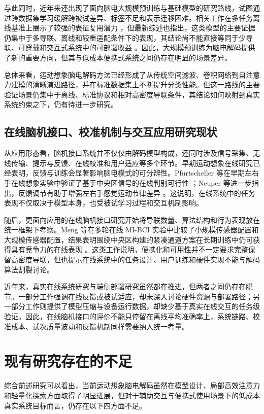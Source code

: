 与此同时，近年来还出现了面向脑电大规模预训练与基础模型的研究路线，试图通过跨数据集学习缓解跨被试差异、标签不足和表示迁移困难。相关工作在多任务离线基准上展示了较强的表征复用潜力 \cite{Jia24, Wan24b}，但最新综述也指出，这类模型的主要证据仍集中于多导联、离线和较重适配条件下的表现，其结论尚不能直接等同于少导联、可穿戴和交互式系统中的可部署收益 \cite{Liu26b}。因此，大规模预训练为脑电解码提供了新的重要方向，但其与低成本便携式系统之间仍存在明显的场景差异。

总体来看，运动想象脑电解码方法已经形成了从传统空间滤波、卷积网络到自注意力建模的清晰演进路径，并在标准数据集上不断提升分类性能。但这一路线的主要验证场景仍集中于离线、标准协议和相对高密度导联条件，其结论如何映射到真实系统约束之下，仍有待进一步研究。

\subsection{在线脑机接口、校准机制与交互应用研究现状}

从应用形态看，脑机接口系统并不仅仅由解码模型构成，还同时涉及信号采集、无线传输、提示与反馈、在线校准和用户适应等多个环节。早期运动想象在线研究已经表明，反馈与训练会显著影响脑电模式的可分辨性。Pfurtscheller 等在早期左右手在线想象实验中验证了基于中央区信号的在线判别可行性 \cite{Pfu97}；Neuper 等进一步指出，反馈调节有助于增强左右手感觉运动节律差异 \cite{Neu99}。这说明，在线系统中的任务表现不仅取决于模型本身，也受被试学习过程和交互机制影响。

随后，更面向应用的在线脑机接口研究开始将导联数量、算法结构和行为表现放在统一框架下考察。Meng 等在多轮在线 MI-BCI 实验中比较了小规模传感器配置和大规模传感器配置，结果表明围绕中央区构建的紧凑通道方案在长期训练中仍可获得具有竞争力的在线表现 \cite{Men18}。这类工作说明，便携化和可用性并不一定要求完整保留高密度导联，但也提示在线系统中的任务设计、用户训练和硬件实现不能与解码算法割裂讨论。

近年来，真实在线系统研究与端侧部署研究虽然都在推进，但两者之间仍存在脱节。一部分工作强调在线反馈或被试适应，却未深入讨论硬件资源与部署路径；另一部分工作则提供了模型压缩与设备运行数据，却缺少基于真实在线交互的任务级验证。因此，在线脑机接口的评价不能只停留在离线平均准确率上，系统链路、校准成本、试次质量波动和反馈机制同样需要纳入统一考量。

\section{现有研究存在的不足}

综合前述研究可以看出，当前运动想象脑电解码虽然在模型设计、局部高效注意力和轻量化探索方面取得了明显进展，但对于辅助交互与便携式使用场景下的低成本真实系统目标而言，仍存在以下四方面不足。

